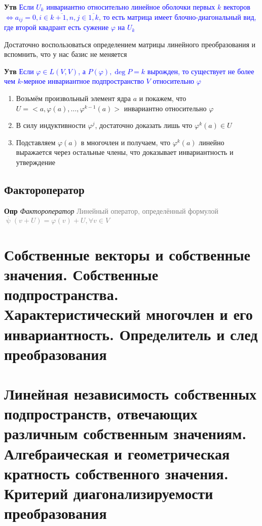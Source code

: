\documentclass[a4paper, 14pt]{article}
\begin{document}
    \textbf{Утв} \textcolor{blue}{Если $U_k$ инвариантно относительно линейное оболочки первых $k$ векторов
        $\Leftrightarrow a_{ij} = 0, i \in \overline{k+1, n}, j \in \overline{1, k}$, то есть матрица имеет
        блочно-диагональный вид, где второй квадрант есть сужение $\varphi$ на $U_k$}

    Достаточно воспользоваться определением матрицы линейного преобразования и вспомнить, что у нас базис не меняется

    \textbf{Утв} \textcolor{blue}{Если $\varphi \in L(V, V)$, а $P(\varphi), \deg P = k$ вырожден, то существует не
    более чем $k$-мерное инвариантное подпространство $V$ относительно $\varphi$}

    \begin{enumerate}
        \item Возьмём произвольный элемент ядра $a$ и покажем, что $U = <a, \varphi(a), \dots, \varphi^{k-1}(a)>$
        инвариантно относительно $\varphi$
        \item В силу индуктивности $\varphi^j$, достаточно доказать лишь что $\varphi^k (a) \in U$
        \item Подставляем $\varphi(a)$ в многочлен и получаем, что $\varphi^k (a)$ линейно выражается через остальные
        члены, что доказывает инвариантность и утверждение
    \end{enumerate}

    \subsection{Фактороператор}

    \textbf{Опр} \textit{Фактороператор} \textcolor{gray}{Линейный оператор, определённый формулой $\overline{\uppsi
    } (v + U) = \varphi (v) + U, \forall v \in V$}

    \section{Собственные векторы и собственные значения.
    Собственные подпространства.
    Характеристический многочлен и его инвариантность.
    Определитель и след преобразования}

    

    \section{Линейная независимость собственных подпространств, отвечающих различным собственным значениям.
    Алгебраическая и геометрическая кратность собственного значения.
    Критерий диагонализируемости преобразования}
\end{document}
